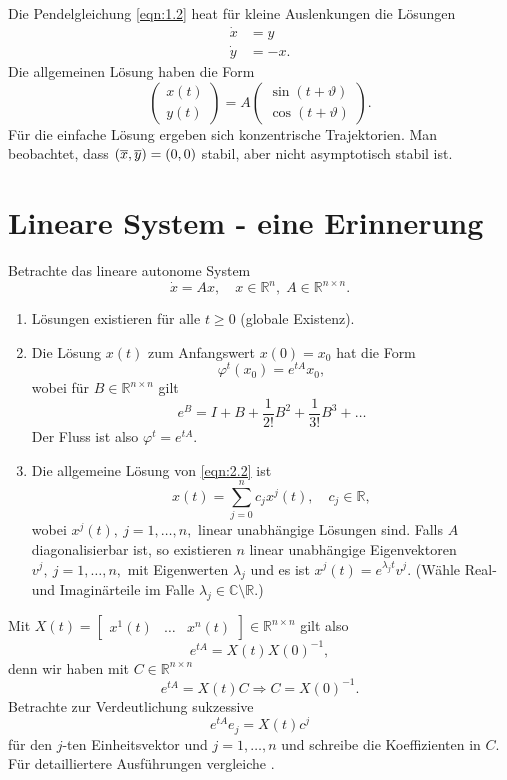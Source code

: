 \documentclass[main.tex]{subfiles}
\begin{document}
\begin{bsp}\label{2.5}
Die Pendelgleichung \eqref{eqn:1.2} heat für kleine Auslenkungen die Lösungen
\begin{align*}
    \dot x &= y\\
    \dot y &= -x.
\end{align*}
Die allgemeinen Lösung haben die Form 
$$
\begin{pmatrix}
x(t)\\y(t)
\end{pmatrix}
= A\begin{pmatrix}
\sin(t+ϑ)\\ \cos(t+ϑ)
\end{pmatrix}.$$
Für die einfache Lösung ergeben sich konzentrische Trajektorien. Man beobachtet, dass $(\overline{x}, \overline{y}) = (0,0)$ stabil, aber nicht asymptotisch stabil ist.
\end{bsp}

\section{Lineare System - eine Erinnerung}\label{section:2.2}
Betrachte das lineare autonome System
\begin{equation}
    \label{eqn:2.2}\dot x = Ax, \quad x\in ℝ^n, \; A\in ℝ^{n\times n}.
\end{equation}
\begin{enumerate}[label=(\roman*)]
    \item Lösungen existieren für alle $t\ge 0$ (globale Existenz).
    \item Die Lösung $x(t)$ zum Anfangswert $x(0) = x_0$ hat die Form
    $$φ^t(x_0) = e^{tA} x_0,$$
    wobei für $B\in ℝ^{n\times n}$ gilt
    $$e^B = I + B + \frac{1}{2!} B^2 + \frac{1}{3!}B^3 + …$$
    Der Fluss ist also $φ^t = e^{tA}$.
    \item Die allgemeine Lösung von \eqref{eqn:2.2} ist
    $$x(t) = \sum_{j=0}^n c_j x^j(t), \quad c_j\in ℝ,$$
    wobei $x^j(t), \ j=1,…, n,$ linear unabhängige Lösungen sind. Falls $A$ diagonalisierbar ist, so existieren $n$ linear unabhängige Eigenvektoren $v^j,\ j=1,…,n,$ mit Eigenwerten $λ_j$ und es ist $x^j(t) = e^{λ_jt} v^j$. (Wähle Real- und Imaginärteile im Falle $λ_j\in ℂ\setminus ℝ$.)
\end{enumerate}
Mit $X(t) = \begin{bmatrix} x^1(t) & … & x^n(t)\end{bmatrix} \in ℝ^{n\times n}$ gilt also 
$$e^{tA} = X(t) X(0)^{-1},$$
denn wir haben mit $C\in ℝ^{n\times n}$
$$e^{tA} = X(t) C \Rightarrow C = X(0)^{-1}.$$
Betrachte zur Verdeutlichung sukzessive 
$$e^{tA} e_j = X(t) c^j$$
für den $j$-ten Einheitsvektor und $j=1,…,n$ und schreibe die Koeffizienten in $C$.
Für detailliertere Ausführungen vergleiche \citet{shupSmale}.
\end{document}

